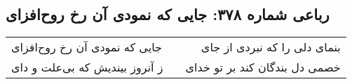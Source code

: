 \begin{center}
\section*{رباعی شماره ۳۷۸: جایی که نمودی آن رخ روح‌افزای}
\label{sec:sh378}
\begin{longtable}{l p{0.5cm} r}
جایی که نمودی آن رخ روح‌افزای
&&
بنمای دلی را که نبردی از جای
\\
ز آنروز بیندیش که بی‌علت و دای
&&
خصمی دل بندگان کند بر تو خدای
\\
\end{longtable}
\end{center}
